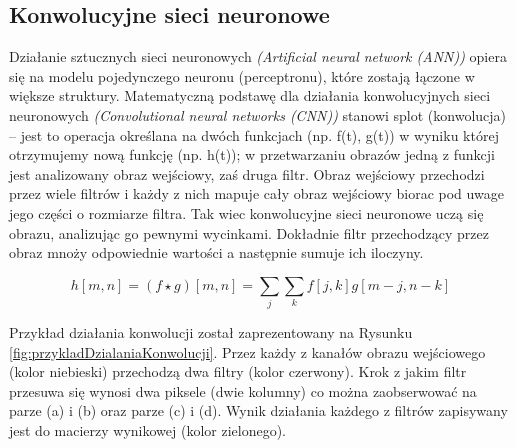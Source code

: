 \documentclass[a4paper,12pt]{article}
\newcommand\spacingIndent{2.2em}
\begin{document}
    \subsection{Konwolucyjne sieci neuronowe}
        \hspace{\spacingIndent} Działanie sztucznych sieci neuronowych \textit{(Artificial neural network (ANN))} opiera się na modelu pojedynczego     
			neuronu (perceptronu), które zostają łączone w większe struktury. Matematyczną podstawę dla działania konwolucyjnych sieci neuronowych 
			\textit{(Convolutional neural networks (CNN))} stanowi splot (konwolucja) -- jest to operacja określana na dwóch funkcjach (np. f(t), g(t)) 
			w wyniku której otrzymujemy nową funkcję (np. h(t)); w przetwarzaniu obrazów jedną z funkcji jest analizowany obraz wejściowy, zaś druga filtr.
            Obraz wejściowy przechodzi przez wiele filtrów i każdy z nich mapuje cały obraz wejściowy biorac pod uwage jego części o rozmiarze filtra. 
			Tak wiec konwolucyjne sieci neuronowe uczą się obrazu, analizując go pewnymi wycinkami. Dokładnie filtr przechodzący przez obraz 
			mnoży odpowiednie wartości a następnie sumuje ich iloczyny.
			
			
        
            \begin{displaymath}
                h[m, n] = ( f \star g)[m, n] = \sum\limits_{j}\sum\limits_{k}f[j, k]g[m-j, n-k]
            \end{displaymath}
            
            Przykład działania konwolucji został zaprezentowany na Rysunku \ref{fig:przykladDzialaniaKonwolucji}. 
            Przez każdy z kanałów obrazu wejściowego (kolor niebieski) przechodzą dwa filtry (kolor czerwony). Krok z jakim filtr przesuwa się wynosi dwa piksele (dwie kolumny) co można zaobserwować na parze (a) i (b) oraz parze (c) i (d). Wynik działania każdego z filtrów zapisywany jest do macierzy wynikowej (kolor zielonego). 
            
            
		    \newpage
		    
\end{document}

